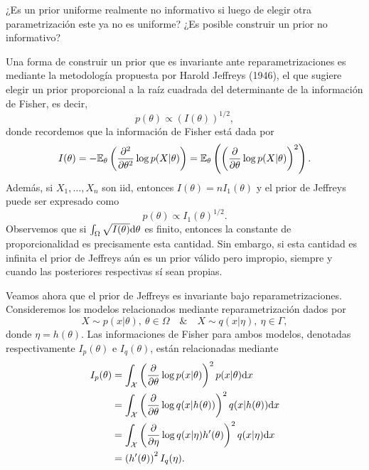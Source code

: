 \begin{remark}
¿Es un prior uniforme realmente no informativo si luego de elegir otra parametrización este ya no es uniforme? ¿Es posible construir un prior no informativo?
\end{remark}

Una forma de construir un prior que es invariante ante reparametrizaciones es mediante la metodología propuesta por  Harold Jeffreys (1946), el que sugiere elegir un prior proporcional a la raíz cuadrada del determinante de la información de Fisher, es decir,  
\begin{equation}
	p(\theta) \propto \left( I(\theta)\right)^{1/2},
\end{equation}
donde recordemos que la información de Fisher está dada por 
\begin{equation}
	I(\theta) = -\mathbb{E}_\theta \left(\frac{\partial^2}{\partial\theta^2}\log p(X|\theta)\right) = \mathbb{E}_\theta \left(\left(\frac{\partial}{\partial\theta}\log p(X|\theta)\right)^2\right).
\end{equation}
Además, si $X_1,\ldots,X_n$ son iid, entonces $I(\theta) = n I_1(\theta)$ y el prior de Jeffreys puede ser expresado como 
\begin{equation}
	p(\theta) \propto  I_1(\theta)^{1/2}.
\end{equation}
Observemos que si $\int_\Omega\sqrt{I(\theta)}{\text{d}}\theta$ es finito, entonces la constante de proporcionalidad es precisamente esta cantidad. Sin embargo, si esta cantidad es infinita el prior de Jeffreys aún es un prior válido pero impropio, siempre y cuando las posteriores respectivas sí sean propias. 

Veamos ahora que el prior de Jeffreys es invariante bajo reparametrizaciones. Consideremos los modelos relacionados mediante reparametrización dados por 
\begin{equation}
	X\sim p(x|\theta),\ \theta\in\Omega\quad \& \quad X\sim q(x|\eta),\ \eta\in\Gamma,
\end{equation}
donde $\eta = h(\theta)$. Las informaciones de Fisher para ambos modelos, denotadas respectivamente $I_p(\theta)$ e $I_q(\theta)$, están relacionadas mediante
\begin{align}
	I_p(\theta) &= \int_{\mathcal X}\left(\frac{\partial}{\partial\theta}\log p(x|\theta)\right)^2p(x|\theta){\text{d}} x\nonumber\\
				&= \int_{\mathcal X}\left(\frac{\partial}{\partial\theta}\log q(x|h(\theta))\right)^2q(x|h(\theta)){\text{d}} x\nonumber\\
				&= \int_{\mathcal X}\left(\frac{\partial}{\partial\eta}\log q(x|\eta) h'(\theta)\right)^2q(x|\eta){\text{d}} x\nonumber\\
				&= \left(h'(\theta)\right)^2 I_q(\eta).
\end{align} 

